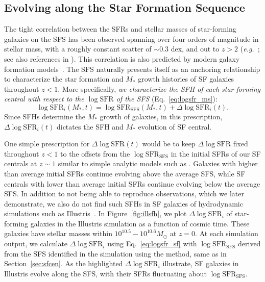 \documentclass[12pt, letterpaper, preprint, tighten]{aastex62}
\newcommand{\edt}[1]{{\color{dred}{\bf} #1}}
\newcommand{\beq}{\begin{equation}}
\newcommand{\eeq}{\end{equation}}
\newcommand{\logsfr}{\log\mathrm{SFR}}
\newcommand{\logsfrsfs}{\log\mathrm{SFR}_\mathrm{SFS}}
\begin{document}
\subsection{Evolving along the Star Formation Sequence} \label{sec:modelevol} 
The tight correlation between the SFRs and stellar masses of star-forming 
galaxies on the SFS has been observed spanning over four orders of magnitude 
in stellar mass, with a roughly constant scatter of ${\sim}0.3$ dex, and out 
to $z > 2$ 
(\emph{e.g.}~\citealt{noeske2007,daddi2007,elbaz2007,salim2007,santini2009,karim2011,whitaker2012,moustakas2013,lee2015}; see also references in \citealt{speagle2014}). 
This correlation is also predicted by modern galaxy formation models~\citep[][see 
\citealt{hahn2018a} and references therein]{somerville2015}. The SFS 
naturally presents itself as an anchoring relationship to characterize 
the star formation and $M_*$ growth histories of SF galaxies throughout $z < 1$. More 
specifically, \emph{we characterize the SFH of each star-forming central 
with respect to the $\logsfr$ of the SFS} (Eq.~\ref{eq:logsfr_ms}):
\beq \label{eq:logsfr_sf} 
\logsfr_i(M_*, t) = \logsfrsfs(M_*, t) + \Delta\logsfr_i(t).
\eeq
Since SFHs determine the $M_*$ growth of galaxies, in this prescription, 
$\Delta \logsfr_i(t)$ dictates the SFH and $M_*$ evolution of SF central.

One simple prescription for $\Delta \logsfr(t)$ would be to keep $\Delta \logsfr$ 
fixed throughout $z < 1$ to the offsets from the $\logsfrsfs$ in the 
initial SFRs of our SF centrals at $z\sim1$ similar to simple analytic 
models such as \cite{mitra2015}. Galaxies with higher than average 
initial SFRs continue evolving above the average SFS, while SF centrals 
with lower than average initial SFRs continue evolving below the average 
SFS. In addition to not being able to reproduce observations, which we
later demonstrate, we also do not find such SFHs in SF galaxies of 
hydrodynamic simulations such as Illustris~\citep{vogelsberger2014,genel2014}. 
In Figure~\ref{fig:illsfh}, we plot $\Delta \logsfr_i$ of star-forming 
galaxies in the Illustris simulation as a function of cosmic time. These 
galaxies have stellar masses within $10^{10.5}-10^{10.6}M_\odot$ at $z=0$. 
At each simulation output, we calculate $\Delta \logsfr_i$ using Eq.~\ref{eq:logsfr_sf}
with $\logsfrsfs$ derived from the SFS identified 
\edt{in the simulation} 
using the \cite{hahn2018a} method, same as in Section~\ref{sec:sfcen}. As the 
highlighted $\Delta \logsfr_i$ illustrate, SF galaxies in Illustris evolve 
along the SFS, with their SFRs fluctuating about $\logsfrsfs$.
\end{document}
